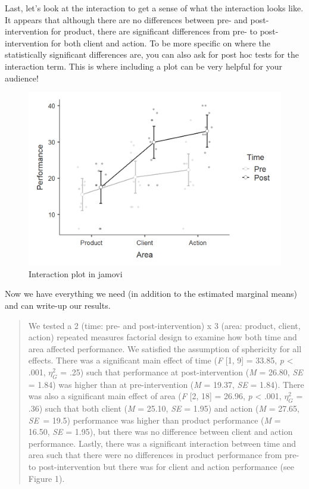 \documentclass[
]{book}
\begin{document}
Last, let's look at the interaction to get a sense of what the interaction looks like. It appears that although there are no differences between pre- and post-intervention for product, there are significant differences from pre- to post-intervention for both client and action. To be more specific on where the statistically significant differences are, you can also ask for post hoc tests for the interaction term. This is where including a plot can be very helpful for your audience!

\begin{figure}

{\centering \includegraphics[width=1\linewidth]{images/06-factorial-anova/rm-factorial_interaction} 

}

\caption{Interaction plot in jamovi}\label{fig:unnamed-chunk-8}
\end{figure}

Now we have everything we need (in addition to the estimated marginal means) and can write-up our results.

\begin{quote}
We tested a 2 (time: pre- and post-intervention) x 3 (area: product, client, action) repeated measures factorial design to examine how both time and area affected performance. We satisfied the assumption of sphericity for all effects. There was a significant main effect of time (\emph{F} {[}1, 9{]} = 33.85, \emph{p} \textless{} .001, \(\eta^2_G\) = .25) such that performance at post-intervention (\emph{M} = 26.80, \emph{SE} = 1.84) was higher than at pre-intervention (\emph{M} = 19.37, \emph{SE} = 1.84). There was also a significant main effect of area (\emph{F} {[}2, 18{]} = 26.96, \emph{p} \textless{} .001, \(\eta^2_G\) = .36) such that both client (\emph{M} = 25.10, \emph{SE} = 1.95) and action (\emph{M} = 27.65, \emph{SE}~= 19.5) performance was higher than product performance (\emph{M} = 16.50, \emph{SE} = 1.95), but there was no difference between client and action performance. Lastly, there was a significant interaction between time and area such that there were no differences in product performance from pre- to post-intervention but there was for client and action performance (see Figure 1).
\end{quote}
\end{document}
